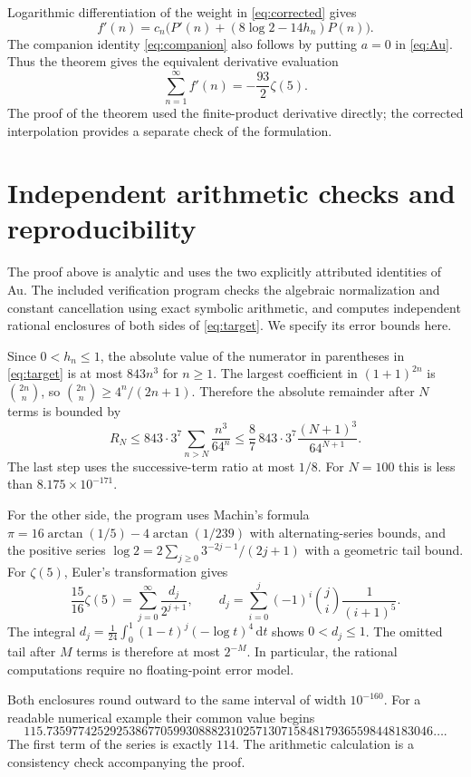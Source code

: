 \documentclass[11pt]{article}
\newcommand{\dd}{\,\mathrm{d}}
\begin{document}
Logarithmic differentiation of the weight in \eqref{eq:corrected} gives
\[
 f'(n)=c_n\bigl(P'(n)+(8\log2-14h_n)P(n)\bigr).
\]
The companion identity \eqref{eq:companion} also follows by putting
$a=0$ in \eqref{eq:Au}. Thus the theorem gives the equivalent
derivative evaluation
\[
 \sum_{n=1}^{\infty}f'(n)=-\frac{93}{2}\zeta(5).
\]
The proof of the theorem used the finite-product derivative directly;
the corrected interpolation provides a separate check of the formulation.

\section{Independent arithmetic checks and reproducibility}\label{sec:check}
The proof above is analytic and uses the two explicitly attributed
identities of Au. The included verification program checks the algebraic
normalization and constant cancellation using exact symbolic arithmetic,
and computes independent rational enclosures of both sides of
\eqref{eq:target}. We specify its error bounds here.

Since $0<h_n\leq1$, the absolute value of the numerator in parentheses
in \eqref{eq:target} is at most $843n^3$ for $n\geq1$.
The largest coefficient in $(1+1)^{2n}$ is $\binom{2n}{n}$, so
$\binom{2n}{n}\geq4^n/(2n+1)$. Therefore the absolute remainder
after $N$ terms is bounded by
\begin{equation}\label{eq:tail}
 R_N\leq843\cdot3^7\sum_{n>N}\frac{n^3}{64^n}
 \leq\frac87\,843\cdot3^7\frac{(N+1)^3}{64^{N+1}}.
\end{equation}
The last step uses the successive-term ratio at most $1/8$.
For $N=100$ this is less than $8.175\times10^{-171}$.

For the other side, the program uses Machin's formula
$\pi=16\arctan(1/5)-4\arctan(1/239)$ with alternating-series bounds,
and the positive series
$\log2=2\sum_{j\geq0}3^{-2j-1}/(2j+1)$ with a geometric tail bound.
For $\zeta(5)$, Euler's transformation gives
\[
 \frac{15}{16}\zeta(5)=\sum_{j=0}^{\infty}\frac{d_j}{2^{j+1}},
 \qquad
 d_j=\sum_{i=0}^{j}(-1)^i\binom ji\frac1{(i+1)^5}.
\]
The integral
$d_j=\frac1{24}\int_0^1(1-t)^j(-\log t)^4\dd t$
shows $0<d_j\leq1$. The omitted tail after $M$ terms is therefore
at most $2^{-M}$. In particular, the rational computations require
no floating-point error model.

Both enclosures round outward to the same interval of width $10^{-160}$.
For a readable numerical example their common value begins
\[
 115.7359774252925386770599308882310257130715848179365598448183046\ldots.
\]
The first term of the series is exactly $114$.
The arithmetic calculation is a consistency check accompanying the proof.
\end{document}
